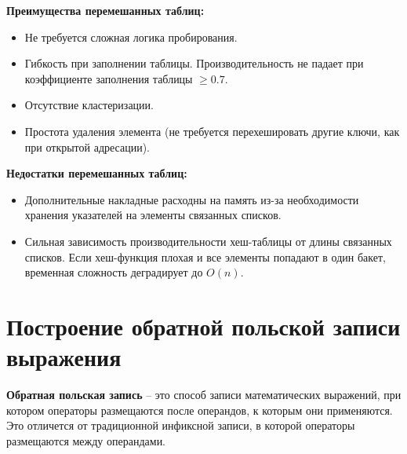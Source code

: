 \begin{minipage}[t]{0.45\textwidth}
	\textbf{Преимущества перемешанных таблиц:}
	\begin{itemize}[label=$\triangleright$, leftmargin=*, font=\scriptsize, noitemsep, topsep=0pt, , partopsep=0pt]
		\item {\footnotesize Не требуется сложная логика пробирования.}
		\item {\footnotesize Гибкость при заполнении таблицы. Производительность не падает при коэффициенте заполнения таблицы $\geq 0.7$.}
		\item {\footnotesize Отсутствие кластеризации.}
		\item {\footnotesize Простота удаления элемента (не требуется перехешировать другие ключи, как при открытой адресации).}
	\end{itemize}
\end{minipage}
\hspace{1cm}
\begin{minipage}[t]{0.45\textwidth}
	\textbf{Недостатки перемешанных таблиц:}
	\begin{itemize}[label=$\triangleright$, leftmargin=*, font=\scriptsize, noitemsep, topsep=0pt, , partopsep=0pt]
		\item {\footnotesize Дополнительные накладные расходны на память из-за необходимости хранения указателей на элементы связанных списков.}
		\item {\footnotesize Сильная зависимость производительности хеш-таблицы от длины связанных списков. Если хеш-функция плохая и все элементы попадают в один бакет, временная сложность деградирует до $O(n)$.}
	\end{itemize}
\end{minipage}
\vspace{50pt}



\section{Построение обратной польской записи выражения}

\textbf{Обратная польская запись} -- это способ записи математических выражений, при котором операторы размещаются после операндов, к которым они применяются. Это отличется от традиционной инфиксной записи, в которой операторы размещаются между операндами.
\vspace{5pt}


